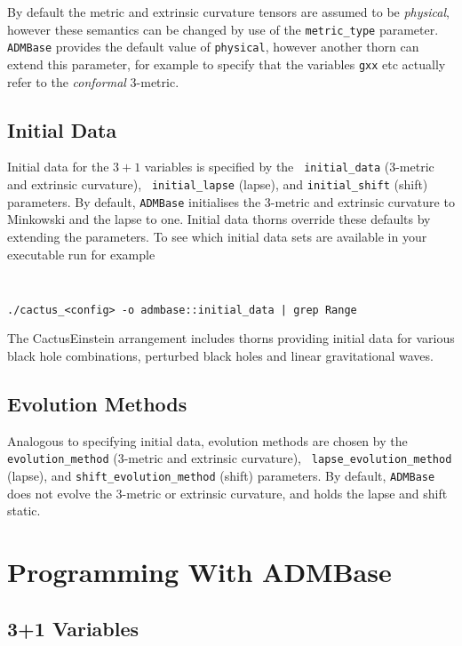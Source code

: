 \documentclass{article}
\begin{document}
By default the metric and extrinsic curvature tensors are assumed to
be {\it physical}, however these semantics can be changed by use of
the {\tt metric\_type} parameter. {\tt  ADMBase} provides the default value
of {\tt physical}, however another thorn can extend this parameter, 
for example to specify that the variables {\tt gxx} etc actually refer
to the {\it conformal} 3-metric.


\subsection{Initial Data}

Initial data for the $3+1$ variables is specified by the {\tt
initial\_data} (3-metric and extrinsic curvature), {\tt
initial\_lapse} (lapse), and {\tt initial\_shift} (shift) parameters.
By default, {\tt ADMBase} initialises the 3-metric and extrinsic
curvature to Minkowski and the lapse to one. Initial data thorns
override these defaults by extending the parameters. To see which
initial data sets are available in your executable run for example

{\tt
\begin{verbatim}
./cactus_<config> -o admbase::initial_data | grep Range
\end{verbatim}
}

The CactusEinstein arrangement includes thorns providing initial data
for various black hole combinations, perturbed black holes and linear
gravitational waves.

\subsection{Evolution Methods}

Analogous to specifying initial data, evolution methods are chosen by
the {\tt evolution\_method} (3-metric and extrinsic curvature), {\tt
lapse\_evolution\_method} (lapse), and {\tt shift\_evolution\_method}
(shift) parameters.  By default, {\tt ADMBase} does not evolve the
3-metric or extrinsic curvature, and holds the lapse and shift static.



\section{Programming With ADMBase}

\subsection{3+1 Variables}
\end{document}
